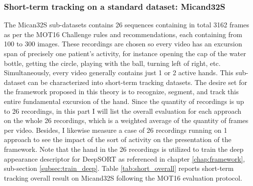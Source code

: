 \subsubsection{Short-term tracking on a standard dataset: Micand32S}
The Mican32S sub-datasets contains 26 sequences containing in total 3162 frames as per the MOT16 Challenge rules and recommendations, each containing from 100 to 300 images. These recordings are chosen so every video has an excursion span of precisely one patient’s activity, for instance opening the cap of the water bottle, getting the circle, playing with the ball, turning left of right, etc. Simultaneously, every video generally contains just 1 or 2 active hands. This sub-dataset can be characterized into short-term tracking datasets. The desire set for the framework proposed in this theory is to recognize, segment, and track this entire fundamental excursion of the hand. Since the quantity of recordings is up to 26 recordings, in this part I will list the overall evaluation for each approach on the whole 26 recordings, which is a weighted average of the quantity of frames per video. Besides, I likewise measure a case of 26 recordings running on 1 approach to see the impact of the sort of activity on the presentation of the framework. Note that the hand in the 26 recordings is utilized to train the deep appearance descriptor for DeepSORT as referenced in chapter \ref{chap:framework}, sub-section \ref{subsec:train_deep}. Table \ref{tab:short_overall} reports short-term tracking overall result on Micand32S following the MOT16 evaluation protocol.
